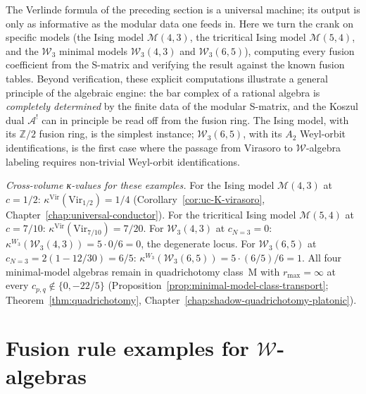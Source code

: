 \providecommand{\BRST}{\mathrm{BRST}}
\providecommand{\BRSTGauged}{\mathrm{BRSTGaugedChirAlg}}

The Verlinde formula of the preceding section is a universal machine;
its output is only as informative as the modular data one feeds in.
Here we turn the crank on specific models (the Ising model
$\mathcal{M}(4,3)$, the tricritical Ising model
$\mathcal{M}(5,4)$, and the $\mathcal{W}_3$ minimal models
$\mathcal{W}_3(4,3)$ and $\mathcal{W}_3(6,5)$), computing every
fusion coefficient from the S-matrix and verifying the result
against the known fusion tables. Beyond verification, these
explicit computations illustrate a general principle of the
algebraic engine: the bar complex of a rational algebra is
\emph{completely determined} by the finite data of the modular
S-matrix, and the Koszul dual $\mathcal{A}^!$ can in principle be
read off from the fusion ring. The Ising model, with its
$\mathbb{Z}/2$ fusion ring, is the simplest instance;
$\mathcal{W}_3(6,5)$, with its $A_2$ Weyl-orbit identifications, is
the first case where the passage from Virasoro to $\mathcal{W}$-algebra
labeling requires non-trivial Weyl-orbit identifications.

\medskip
\noindent\emph{Cross-volume κ-values for these examples.}
For the Ising model $\mathcal{M}(4,3)$ at $c = 1/2$:
$\kappa^{\mathrm{Vir}}(\mathrm{Vir}_{1/2}) = 1/4$
(Corollary~\ref{cor:uc-K-virasoro},
Chapter~\ref{chap:universal-conductor}). For the tricritical
Ising model $\mathcal{M}(5,4)$ at $c = 7/10$:
$\kappa^{\mathrm{Vir}}(\mathrm{Vir}_{7/10}) = 7/20$. For
$\mathcal{W}_3(4,3)$ at $c_{N=3} = 0$:
$\kappa^{W_3}(\mathcal{W}_3(4,3)) = 5 \cdot 0/6 = 0$, the
degenerate locus. For $\mathcal{W}_3(6,5)$ at
$c_{N=3} = 2(1 - 12/30) = 6/5$:
$\kappa^{W_3}(\mathcal{W}_3(6,5)) = 5 \cdot (6/5)/6 = 1$. All
four minimal-model algebras remain in quadrichotomy class~M with
$r_{\max} = \infty$ at every $c_{p,q} \notin \{0, -22/5\}$
(Proposition~\ref{prop:minimal-model-class-transport};
Theorem~\ref{thm:quadrichotomy},
Chapter~\ref{chap:shadow-quadrichotomy-platonic}).
\medskip

\section{Fusion rule examples for $\mathcal{W}$-algebras}
\label{sec:fusion-examples}

